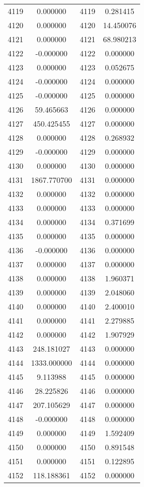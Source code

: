 \documentclass[12pt]{article}
\begin{document}
\begin{longtable}{@{}cccc@{}}
4119 & 0.000000 & 4119 & 0.281415 \\
4120 & 0.000000 & 4120 & 14.450076 \\
4121 & 0.000000 & 4121 & 68.980213 \\
4122 & -0.000000 & 4122 & 0.000000 \\
4123 & 0.000000 & 4123 & 0.052675 \\
4124 & -0.000000 & 4124 & 0.000000 \\
4125 & -0.000000 & 4125 & 0.000000 \\
4126 & 59.465663 & 4126 & 0.000000 \\
4127 & 450.425455 & 4127 & 0.000000 \\
4128 & 0.000000 & 4128 & 0.268932 \\
4129 & -0.000000 & 4129 & 0.000000 \\
4130 & 0.000000 & 4130 & 0.000000 \\
4131 & 1867.770700 & 4131 & 0.000000 \\
4132 & 0.000000 & 4132 & 0.000000 \\
4133 & 0.000000 & 4133 & 0.000000 \\
4134 & 0.000000 & 4134 & 0.371699 \\
4135 & 0.000000 & 4135 & 0.000000 \\
4136 & -0.000000 & 4136 & 0.000000 \\
4137 & 0.000000 & 4137 & 0.000000 \\
4138 & 0.000000 & 4138 & 1.960371 \\
4139 & 0.000000 & 4139 & 2.048060 \\
4140 & 0.000000 & 4140 & 2.400010 \\
4141 & 0.000000 & 4141 & 2.279885 \\
4142 & 0.000000 & 4142 & 1.907929 \\
4143 & 248.181027 & 4143 & 0.000000 \\
4144 & 1333.000000 & 4144 & 0.000000 \\
4145 & 9.113988 & 4145 & 0.000000 \\
4146 & 28.225826 & 4146 & 0.000000 \\
4147 & 207.105629 & 4147 & 0.000000 \\
4148 & -0.000000 & 4148 & 0.000000 \\
4149 & 0.000000 & 4149 & 1.592409 \\
4150 & 0.000000 & 4150 & 0.891548 \\
4151 & 0.000000 & 4151 & 0.122895 \\
4152 & 118.188361 & 4152 & 0.000000 \\

\end{longtable}
\end{document}
